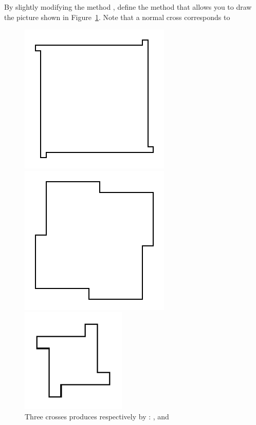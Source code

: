 \begin{exonofig}
By slightly modifying the method , define the method
 that allows you to draw the picture shown in
Figure~\ref{fig:c8croix1}.  Note that a normal cross corresponds to
\end{exonofig}


\begin{figure}[!h]
\begin{minipage}[c]{.3\linewidth}
\includegraphics{Argcrossscr2.pdf}
\end{minipage}
\begin{minipage}[c]{.3\linewidth}
\includegraphics{Argcrossscr3}
\end{minipage}
\begin{minipage}[c]{.3\linewidth}
\includegraphics[width=5cm]{Argcrossscr4}
\end{minipage}
\label{c8croix1}
\caption{Three crosses produces respectively by : ,  and  \label{fig:c8croix1}}
\end{figure}




